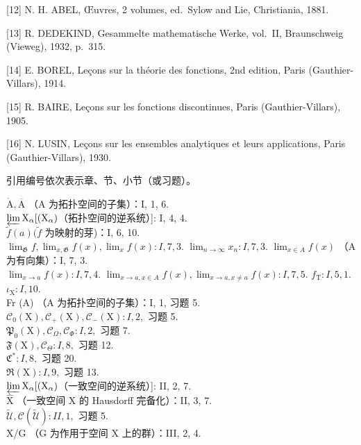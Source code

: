 {[}12{]} N. H. ABEL, Œuvres, 2 volumes, ed.~Sylow and Lie, Christiania, 1881.

{[}13{]} R. DEDEKIND, Gesammelte mathematische Werke, vol.~II, Braunschweig (Vieweg), 1932, p.~315.

{[}14{]} E. BOREL, Leçons sur la théorie des fonctions, 2nd edition, Paris (Gauthier-Villars), 1914.

{[}15{]} R. BAIRE, Leçons sur les fonctions discontinues, Paris (Gauthier-Villars), 1905.

{[}16{]} N. LUSIN, Leçons sur les ensembles analytiques et leurs applications, Paris (Gauthier-Villars), 1930.


引用编号依次表示章、节、小节（或习题）。

\(\mathring{\mathrm{A}}, \overline{\mathrm{A}}\) （A 为拓扑空间的子集）：I, 1, 6.\\
\(\varprojlim \mathrm{X}_{\alpha}[(\mathrm{X}_{\alpha})\)（拓扑空间的逆系统）{]}: I, 4, 4.\\
\(\tilde{f}(a) (\tilde{f}\) 为映射的芽)：I, 6, 10.\\
\(\lim_{\mathfrak{G}} f, \lim_{x, \mathfrak{G}} f(x), \lim_{x} f(x): I, 7, 3.\) \(\lim_{n \to \infty} x_n: I, 7, 3.\) \(\lim_{x \in A} f(x)\) （A 为有向集）：I, 7, 3.\\
\(\lim_{x \to a} f(x): I, 7, 4.\) \(\lim_{x \to a, x \in A} f(x), \lim_{x \to a, x \neq a} f(x): I, 7, 5.\) \(f_{\mathrm{T}}: I, 5, 1.\) \(\iota_{\mathrm{X}}: I, 10.\)\\
Fr (A) （A 为拓扑空间的子集）：I, 1, 习题 5.\\
\(\mathcal{C}_0(\mathrm{X}), \mathcal{C}_+(\mathrm{X}), \mathcal{C}_-(\mathrm{X}): I, 2,\) 习题 5.\\
\(\mathfrak{P}_0(\mathrm{X}), \mathcal{C}_\Omega, \mathcal{C}_\Phi: I, 2,\) 习题 7.\\
\(\mathfrak{F}(\mathrm{X}), \mathcal{C}_\Theta: I, 8,\) 习题 12.\\
\(\mathfrak{C}^*: I, 8,\) 习题 20.\\
\(\mathfrak{R}(\mathrm{X}): I, 9,\) 习题 13.\\
\(\varprojlim \mathrm{X}_{\alpha}[(\mathrm{X}_{\alpha})\)（一致空间的逆系统）{]}: II, 2, 7.\\
\(\hat{\mathrm{X}}\) （一致空间 X 的 Hausdorff 完备化）：II, 3, 7.\\
\(\tilde{\mathcal{U}}, \mathcal{C}(\tilde{\mathcal{U}}): II, 1,\) 习题 5.\\
X/G （G 为作用于空间 X 上的群）：III, 2, 4.


